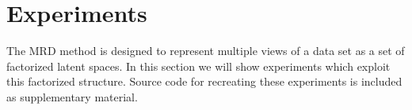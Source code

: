 \section{Experiments \label{experiments}}
The MRD method is designed to represent multiple views of a data set
as a set of factorized latent spaces. In this section we will show
experiments which exploit this factorized structure. Source code for
recreating these experiments is included as supplementary material.

%
%
%
%

